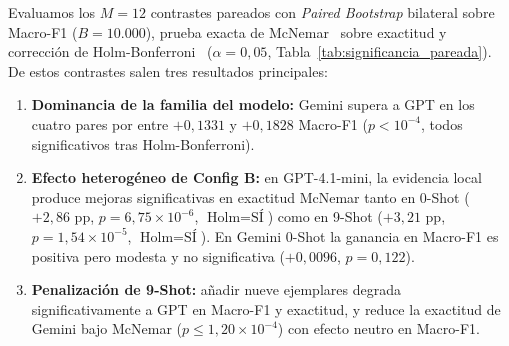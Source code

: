 \documentclass[conference]{IEEEtran}
\begin{document}
Evaluamos los $M=12$ contrastes pareados con \textit{Paired Bootstrap} bilateral sobre Macro-F1 ($B=10.000$), prueba exacta de McNemar~\cite{mcnemar1947note} sobre exactitud y corrección de Holm-Bonferroni~\cite{holm1979simple} ($\alpha=0,05$, Tabla~\ref{tab:significancia_pareada}). De estos contrastes salen tres resultados principales:
\begin{enumerate}
    \item \textbf{Dominancia de la familia del modelo:} Gemini supera a GPT en los cuatro pares por entre $+0,1331$ y $+0,1828$ Macro-F1 ($p < 10^{-4}$, todos significativos tras Holm-Bonferroni).
    \item \textbf{Efecto heterogéneo de Config B:} en GPT-4.1-mini, la evidencia local produce mejoras significativas en exactitud McNemar tanto en 0-Shot ($+2,86\text{ pp}$, $p = 6,75 \times 10^{-6}$, $\text{Holm}=\text{SÍ}$) como en 9-Shot ($+3,21\text{ pp}$, $p = 1,54 \times 10^{-5}$, $\text{Holm}=\text{SÍ}$). En Gemini 0-Shot la ganancia en Macro-F1 es positiva pero modesta y no significativa ($+0,0096$, $p = 0,122$).
    \item \textbf{Penalización de 9-Shot:} añadir nueve ejemplares degrada significativamente a GPT en Macro-F1 y exactitud, y reduce la exactitud de Gemini bajo McNemar ($p \le 1,20 \times 10^{-4}$) con efecto neutro en Macro-F1.
\end{enumerate}
\end{document}
